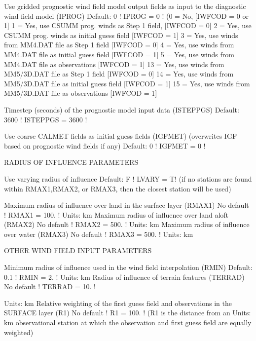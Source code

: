 \documentclass[a4paper,10pt]{article}
\begin{document}
       Use gridded prognostic wind field model
       output fields as input to the diagnostic
       wind field model (IPROG)              Default: 0      ! IPROG =  0  !
       (0 = No, [IWFCOD = 0 or 1]
        1 = Yes, use CSUMM prog. winds as Step 1 field, [IWFCOD = 0]
        2 = Yes, use CSUMM prog. winds as initial guess field [IWFCOD = 1]
        3 = Yes, use winds from MM4.DAT file as Step 1 field [IWFCOD = 0]
        4 = Yes, use winds from MM4.DAT file as initial guess field [IWFCOD = 1]
        5 = Yes, use winds from MM4.DAT file as observations [IWFCOD = 1]
        13 = Yes, use winds from MM5/3D.DAT file as Step 1 field [IWFCOD = 0]
        14 = Yes, use winds from MM5/3D.DAT file as initial guess field [IWFCOD = 1]
        15 = Yes, use winds from MM5/3D.DAT file as observations [IWFCOD = 1]

       Timestep (seconds) of the prognostic
       model input data   (ISTEPPGS)         Default: 3600   ! ISTEPPGS =  3600   !

       Use coarse CALMET fields as initial guess fields (IGFMET)
       (overwrites IGF based on prognostic wind fields if any)
                                             Default: 0      ! IGFMET =  0  !

    RADIUS OF INFLUENCE PARAMETERS

       Use varying radius of influence       Default: F      ! LVARY =  T!
       (if no stations are found within RMAX1,RMAX2,
        or RMAX3, then the closest station will be used)

       Maximum radius of influence over land
       in the surface layer (RMAX1)          No default      ! RMAX1 = 100. !
                                             Units: km
       Maximum radius of influence over land
       aloft (RMAX2)                         No default      ! RMAX2 = 500. !
                                             Units: km
       Maximum radius of influence over water
       (RMAX3)                               No default      ! RMAX3 = 500. !
                                             Units: km


    OTHER WIND FIELD INPUT PARAMETERS

       Minimum radius of influence used in
       the wind field interpolation (RMIN)   Default: 0.1    ! RMIN = 2. !
                                             Units: km
       Radius of influence of terrain
       features (TERRAD)                     No default      ! TERRAD = 10. !

                                             Units: km
       Relative weighting of the first
       guess field and observations in the
       SURFACE layer (R1)                    No default      ! R1 = 100. !
       (R1 is the distance from an           Units: km
       observational station at which the
       observation and first guess field are
       equally weighted)
\end{document}
